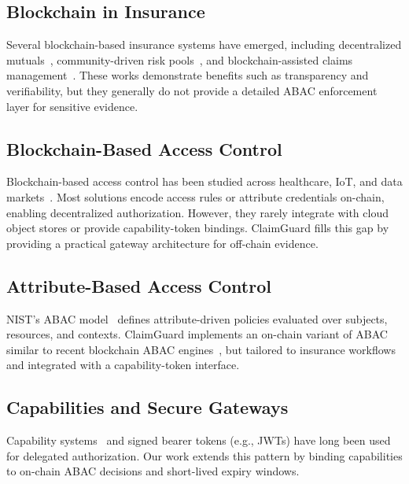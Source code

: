 \documentclass[conference]{IEEEtran}
\begin{document}
\subsection{Blockchain in Insurance}

Several blockchain-based insurance systems have emerged, including decentralized mutuals~\cite{nexusmutual}, community-driven risk pools~\cite{teambrella}, and blockchain-assisted claims management~\cite{cai_insurance_blockchain}. These works demonstrate benefits such as transparency and verifiability, but they generally do not provide a detailed ABAC enforcement layer for sensitive evidence.

\subsection{Blockchain-Based Access Control}

Blockchain-based access control has been studied across healthcare, IoT, and data markets~\cite{abac_blockchain_survey, medrec, healthchain}. Most solutions encode access rules or attribute credentials on-chain, enabling decentralized authorization. However, they rarely integrate with cloud object stores or provide capability-token bindings. ClaimGuard fills this gap by providing a practical gateway architecture for off-chain evidence.

\subsection{Attribute-Based Access Control}

NIST’s ABAC model~\cite{hu_abac_nist} defines attribute-driven policies evaluated over subjects, resources, and contexts. ClaimGuard implements an on-chain variant of ABAC similar to recent blockchain ABAC engines~\cite{abac_blockchain_survey}, but tailored to insurance workflows and integrated with a capability-token interface.

\subsection{Capabilities and Secure Gateways}

Capability systems~\cite{levy_capabilities} and signed bearer tokens (e.g., JWTs) have long been used for delegated authorization. Our work extends this pattern by binding capabilities to on-chain ABAC decisions and short-lived expiry windows.

\end{document}
